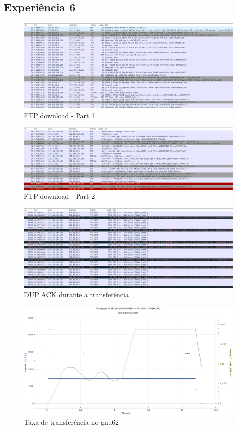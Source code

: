 \documentclass[article, a4paper, 11pt, oneside]{memoir}
\begin{document}
\newpage
\subsection{Experiência 6}
\begin{figure}[h]
	\centering
\includegraphics[scale=0.37]{exp6-step3-part1.png}
\caption{FTP download - Part 1}
\end{figure}

\begin{figure}[h]
	\centering
\includegraphics[scale=0.37]{exp6-step3-part2.png}
\caption{FTP download - Part 2}
\end{figure}

\begin{figure}[h]
	\centering
\includegraphics[scale=0.37]{exp6-step5-error.png}
\caption{DUP ACK durante a transferência}
\end{figure}

\newpage
\begin{figure}[h]
	\centering
\includegraphics[scale=0.35]{exp6-step5-gnu62-graph.png}
\caption{Taxa de transferência no gnu62}
\end{figure}
\end{document}
